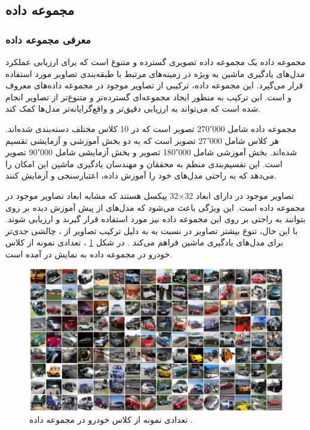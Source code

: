 \subsection{
	مجموعه داده
}


\vspace{3mm}
\subsubsection{
	معرفی مجموعه داده
}\vspace{-1mm}


مجموعه داده
یک مجموعه داده تصویری گسترده و متنوع است که برای ارزیابی عملکرد مدل‌های یادگیری ماشین به ویژه در زمینه‌های مرتبط با طبقه‌بندی تصاویر مورد استفاده قرار می‌گیرد. این مجموعه داده، ترکیبی از تصاویر موجود در مجموعه‌ داده‌های معروف
و
است. این ترکیب به منظور ایجاد مجموعه‌ای گسترده‌تر و متنوع‌تر از تصاویر انجام شده است که می‌تواند به ارزیابی دقیق‌تر و واقع‌گرایانه‌تر مدل‌ها کمک کند.

مجموعه داده
شامل 270٬000 تصویر است که در 10 کلاس مختلف دسته‌بندی شده‌اند. هر کلاس شامل 27٬000 تصویر است که به دو بخش آموزشی و آزمایشی تقسیم شده‌اند. بخش آموزشی شامل 180٬000 تصویر و بخش آزمایشی شامل 90٬000 تصویر است. این تقسیم‌بندی منظم به محققان و مهندسان یادگیری ماشین این امکان را می‌دهد که به راحتی مدل‌های خود را آموزش داده، اعتبارسنجی و آزمایش کنند.

تصاویر موجود در
دارای ابعاد
32$\times$32
پیکسل هستند که مشابه ابعاد تصاویر موجود در مجموعه داده
است. این ویژگی باعث می‌شود که مدل‌های از پیش آموزش دیده بر روی
بتوانند به راحتی بر روی این مجموعه داده نیز مورد استفاده قرار گیرند و ارزیابی شوند. با این حال، تنوع بیشتر تصاویر در
نسبت به
به دلیل ترکیب تصاویر از
،
چالشی جدی‌تر برای مدل‌های یادگیری ماشین فراهم می‌کند
\cite{darlow2018cinic}.
در شکل
\ref{cinic10}%
، تعدادی نمونه از کلاس خودرو در مجموعه داده
\mbox{}
به نمایش در آمده است.


\begin{figure}[b!]
	\centering
	\includegraphics[scale=0.5]{images/chap5/cinic10.png}%
	\caption{%
		تعدادی نمونه از کلاس خودرو در مجموعه داده
		\cite{darlow2018cinic}.
	}
	\label{cinic10}
	\centering
\end{figure}



